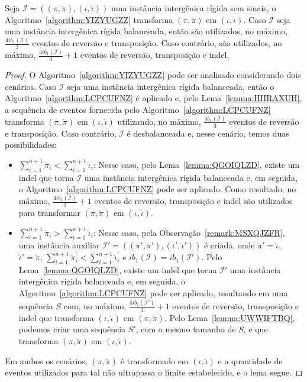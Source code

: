 \begin{lemma}\label{lemma:MUTXDAUG}
Seja $\mathcal{I} = ((\pi,\breve\pi),(\iota,\breve\iota))$ uma instância intergênica rígida sem sinais, o Algoritmo~\ref{algorithm:YIZYUGZZ} transforma $(\pi,\breve\pi)$ em $(\iota,\breve\iota)$. Caso $\mathcal{I}$ seja uma instância intergênica rígida balanceada, então são utilizados, no máximo, $\frac{4ib_1(\mathcal{I})}{3}$ eventos de reversão e transposição. Caso contrário, são utilizados, no máximo, $\frac{4ib_1(\mathcal{I})}{3} + 1$ eventos de reversão, transposição e indel.
\end{lemma}
\begin{proof}
O Algoritmo~\ref{algorithm:YIZYUGZZ} pode ser analisado considerando dois cenários. Caso $\mathcal{I}$ seja uma instância intergênica rígida balanceada, então o Algoritmo~\ref{algorithm:LCPCUFNZ} é aplicado e, pelo Lema~\ref{lemma:HIIRAXUH}, a sequência de eventos fornecida pelo Algoritmo~\ref{algorithm:LCPCUFNZ} transforma $(\pi,\breve\pi)$ em $(\iota,\breve\iota)$ utilizando, no máximo, $\frac{4b_1(\mathcal{I})}{3}$ eventos de reversão e transposição. Caso contrário, $\mathcal{I}$ é desbalanceada e, nesse cenário, temos duas possibilidades:
\begin{itemize}
  \item $\sum_{i=1}^{n+1}\breve\pi_i < \sum_{i=1}^{n+1}\breve\iota_i$: Nesse caso, pelo Lema~\ref{lemma:QGOIQLZD}, existe um indel que torna $\mathcal{I}$ uma instância intergênica rígida balanceada e, em seguida, o Algoritmo~\ref{algorithm:LCPCUFNZ} pode ser aplicado. Como resultado, no máximo, $\frac{4ib_1(\mathcal{I})}{3} + 1$ eventos de reversão, transposição e indel são utilizados para transformar $(\pi,\breve\pi)$ em $(\iota,\breve\iota)$.
  \item $\sum_{i=1}^{n+1}\breve\pi_i > \sum_{i=1}^{n+1}\breve\iota_i$: Nesse caso, pela Observação~\ref{remark:MSXQJZFR}, uma instância auxiliar $\mathcal{I'}=((\pi',\breve\pi'),(\iota',\breve\iota'))$ é criada, onde $\breve\pi' = \breve\iota$, $\breve\iota' = \breve\pi$, $\sum_{i=1}^{n+1}\breve\pi^{'}_i < \sum_{i=1}^{n+1}\breve\iota^{'}_i$ e $ib_1(\mathcal{I}) = ib_1(\mathcal{I'})$. Pelo Lema~\ref{lemma:QGOIQLZD}, existe um indel que torna $\mathcal{I'}$ uma instância intergênica rígida balanceada e, em seguida, o Algoritmo~\ref{algorithm:LCPCUFNZ} pode ser aplicado, resultando em uma sequência $S$ com, no máximo, $\frac{4ib_1(\mathcal{I}')}{3} + 1$ eventos de reversão, transposição e indel que transforma $(\iota,\breve\iota)$ em $(\pi,\breve\pi)$. Pelo Lema~\ref{lemma:UWWIFTBQ}, podemos criar uma sequência $S'$, com o mesmo tamanho de $S$, e que transforma $(\pi,\breve\pi)$ em $(\iota,\breve\iota)$.
\end{itemize}
Em ambos os cenários, $(\pi,\breve\pi)$ é transformado em $(\iota,\breve\iota)$ e a quantidade de eventos utilizados para tal não ultrapassa o limite estabelecido, e o lema segue.
\end{proof}


